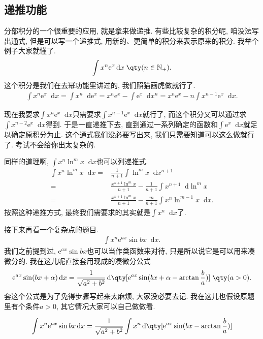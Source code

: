 \documentclass{ctexbook}
\newcommand{\e}{\mathrm{e}}
\newcommand*{\dif}{\mathop{}\!\mathrm{d}}
\begin{document}
{\subsection{递推功能}
分部积分的一个很重要的应用, 就是拿来做递推. 有些比较复杂的积分呢, 咱没法写出通式, 但是可以写一个递推式, 用新的、更简单的积分来表示原来的积分. 我举个例子大家就懂了. 
\begin{align*}
\int x^{n}\e^{x}\dif{x}\;\qty(n\in\mathbb{N_{+}})
.\end{align*}
这个积分是我们在去幂功能里讲过的, 我们照猫画虎做就行了. 
\begin{align*}
\int x^{n}\e^{x}\dif{x}=\int x^{n}\dif{\e^{x}}=x^{n}\e^{x}-\int\e^{x}\dif{x^{n}}=x^{n}\e^{x}-n\int x^{n-1}\e^{x}\dif{x}
.\end{align*}\par
现在我要求$\int x^{n}\e^{x}\dif{x}$只需要求$\int x^{n-1}\e^{x}\dif{x}$就行了, 而这个积分又可以通过求$\int x^{n-2}\e^{x}\dif{x}$得到. 于是一直递推下去, 直到通过一系列确定的函数和$\int\e^{x}\dif{x}$就足以确定原积分为止. 这个通式我们没必要写出来, 我们只需要知道可以这么做就行了. 考试不会给你出太复杂的. \par
同样的道理啊, $\int x^{n}\ln^{m}{x}\dif{x}$也可以列递推式. 
\begin{align*}
\int x^{n}\ln^{m}{x}\dif{x}={}&\frac{1}{n+1}\int\ln^{m}{x}\dif{x^{n+1}}\\
={}&\frac{x^{n+1}\ln^{m}{x}}{n+1}-\frac{1}{n+1}\int x^{n+1}\dif{\ln^{m}{x}}\\
={}&\frac{x^{n+1}\ln^{m}{x}}{n+1}-\frac{m}{n+1}\int x^{n}\ln^{m-1}{x}\dif{x}
.\end{align*}
按照这种递推方式, 最终我们需要求的其实就是$\int x^{n}\dif{x}$了. \par
接下来再看一个复杂点的题目. 
\begin{align*}
\int x^{n}\e^{ax}\sin{bx}\dif{x}
.\end{align*}
我们之前提到过, $\e^{ax}\sin{bx}$也可以当作\uppercase\expandafter{}类函数来对待, 只是所以说它是可以用来凑微分的. 我在这儿呢直接套用现成的凑微分公式
\begin{align*}
\e^{ax}\sin(bx+\alpha)\dif{x}=\frac{1}{\sqrt{a^{2}+b^{2}}}\dif{\qty[\e^{ax}\sin(bx+\alpha-\arctan{\frac{b}{a}})]}\;\qty(a>0)
.\end{align*}
套这个公式是为了免得步骤写起来太麻烦, 大家没必要去记. 我在这儿也假设原题里有个条件$a>0$, 其它情况大家可以自己做做看. \par
\begin{align*}
\int x^{n}\e^{ax}\sin{bx}\dif{x}={}&\frac{1}{\sqrt{a^{2}+b^{2}}}\int x^{n}\dif{\qty[\e^{ax}\sin(bx-\arctan{\frac{b}{a}})]}\\

\end{align*}}
\end{document}
